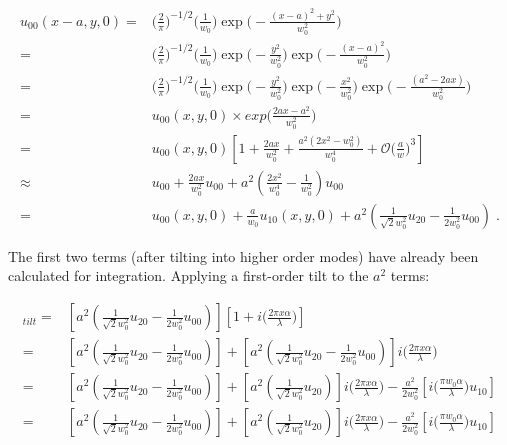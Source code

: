 \documentclass[aps,twoside,secnumarabic,balancelastpage,amsmath,amssymb,nofootinbib,hyperref=pdftex]{revtex4}
\newcommand{\bigfrac}[2]{\Big( \frac{#1}{#2}\Big)}
\begin{document}
	\begin{align*}
		u_{00}(x-a,y,0) 
			=&\Big(\frac{2}{\pi}\Big)^{-1/2}
			\Big(\frac{1}{w_{0}}\Big)
			\exp\Big(-\frac{(x-a)^{2}+y^{2}}{w_{0}^{2}}\Big)
		\nonumber\\	
			= & \Big(\frac{2}{\pi}\Big)^{-1/2} 
			\Big(\frac{1}{w_{0}}\Big)
			\exp\Big(-\frac{y^{2}}{w_{0}^{2}}\Big)
			\exp\Big(-\frac{(x-a)^{2}}{w_{0}^{2}}\Big)
			\nonumber\\	
			= &
			\Big(\frac{2}{\pi}\Big)^{-1/2} 
			\Big(\frac{1}{w_{0}}\Big)
			\exp\Big(-\frac{y^{2}}{w_{0}^{2}}\Big)
			\exp\Big(-\frac{x^2}{w_{0}^{2}}\Big)
			\exp\Big(-\frac{(a^2-2ax)}{w_{0}^{2}}\Big)
		\nonumber\\	
			= & u_{00}(x,y,0) \times exp \Big( \frac{2ax - a^{2}}{w_{0}^2} 			\Big)
		\nonumber\\
			=	& u_{00}(x,y,0)
			\left[ 
			1+ \frac{2ax}{w_{0}^{2}}
			+ \frac{a^2(2x^2-w_0^2)}{w_0^4}			
			+ \mathcal{O} \bigfrac{a}{w}^{3} \right]
		\nonumber\\ 
		\nonumber\approx	& 
		u_{00} 
		+ \frac{2ax}{w_{0}^{2}} u_{00}
		+ a^2
		(
			\frac{2x^2}{w_0^4}
			-
			\frac{1}{w_0^2} 
		)
		u_{00}
			\\
	= &
	u_{00}(x,y,0)
	+ 
	\frac{a}{w_{0}}u_{10}(x,y,0) 
	+
	a^2
		(
			\frac{1}{\sqrt{2}w_0^2} u_{20}
			-			
			\frac{1}{2w_0^2} u_{00}
		)
	\;.
	\end{align*}
	
The first two terms (after tilting into higher order modes) have already been calculated for integration. Applying a first-order tilt to the $a^2$ terms:



\begin{align*}
[a^2
		(
			\frac{1}{\sqrt{2}w_0^2} u_{20}
			-			
			\frac{1}{2w_0^2} u_{00}
		)
		]_{tilt}
		=&
		[a^2
		(
			\frac{1}{\sqrt{2}w_0^2} u_{20}
			-			
			\frac{1}{2w_0^2} u_{00}
		)
		]
		\left[
			1 + i \bigfrac{2 \pi x \alpha}{\lambda} \right]
			\\=&
		[a^2
		(
			\frac{1}{\sqrt{2}w_0^2} u_{20}
			-			
			\frac{1}{2w_0^2} u_{00}
		)
		]
		+
		[a^2
		(
			\frac{1}{\sqrt{2}w_0^2} u_{20}
			-			
			\frac{1}{2w_0^2} u_{00}
		)
		]	
		i \bigfrac{2 \pi x \alpha}{\lambda}
\\=&
		[a^2
		(
			\frac{1}{\sqrt{2}w_0^2} u_{20}
			-			
			\frac{1}{2w_0^2} u_{00}
		)
		]
		+
		[a^2
		(
			\frac{1}{\sqrt{2}w_0^2} u_{20}
		)
		]	
		i \bigfrac{2 \pi x \alpha}{\lambda}
		-
		\frac{ a^2}{2w_0^2}
		[i  \bigfrac{\pi w_{0} \alpha}{\lambda}u_{10}
		 ]	 
		 \\=&
		[a^2
		(
			\frac{1}{\sqrt{2}w_0^2} u_{20}
			-			
			\frac{1}{2 w_0^2} u_{00}
		)
		]
		+
		[a^2
		(
			\frac{1}{\sqrt{2}w_0^2} u_{20}
		)
		]	
		i \bigfrac{2 \pi x \alpha}{\lambda}
		-
		\frac{a^2}{2w_0^2}
		[i  \bigfrac{\pi w_{0} \alpha}{\lambda}u_{10}
		 ]	
\end{align*}
\end{document}
